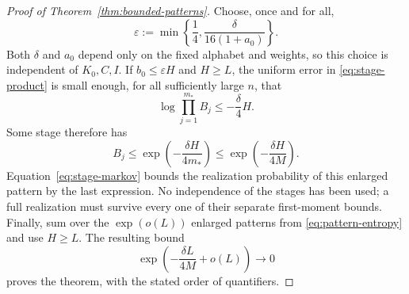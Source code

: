 \begin{proof}[Proof of Theorem~\ref{thm:bounded-patterns}]
Choose, once and for all,
\begin{equation}\label{eq:epsilon-choice}
 \varepsilon:=\min\left\{\frac14,
                  \frac{\delta}{16(1+a_0)}\right\}.
\end{equation}
Both $\delta$ and $a_0$ depend only on the fixed alphabet and weights,
so this choice is independent of $K_0,C,I$.  If $b_0\leq\varepsilon H$
and $H\geq L$, the uniform error in \eqref{eq:stage-product} is small
enough, for all sufficiently large $n$, that
\[
 \log\prod_{j=1}^{m_*}B_j\leq-\frac\delta4H.
\]
Some stage therefore has
\[
 B_j\leq\exp\left(-\frac{\delta H}{4m_*}\right)
       \leq\exp\left(-\frac{\delta H}{4M}\right).
\]
Equation~\eqref{eq:stage-markov} bounds the realization probability
of this enlarged pattern by the last expression.  No independence of
the stages has been used; a full realization must survive every one
of their separate first-moment bounds.  Finally, sum over the
$\exp(o(L))$ enlarged patterns from \eqref{eq:pattern-entropy} and
use $H\geq L$.  The resulting bound
\[
 \exp\left(-\frac{\delta L}{4M}+o(L)\right)
 \longrightarrow0
\]
proves the theorem, with the stated order of quantifiers.
\end{proof}

